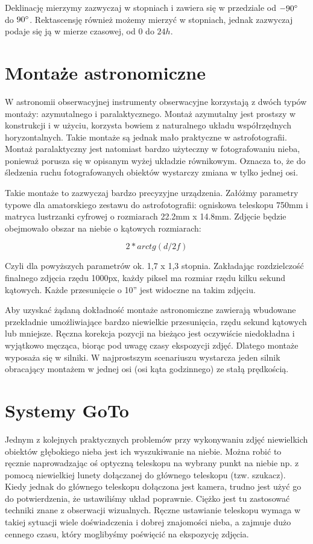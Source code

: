 Deklinację mierzymy zazwyczaj w stopniach i zawiera się w przedziale od
$-90\degree$ do $90\degree$. Rektascensję również możemy mierzyć w stopniach,
jednak zazwyczaj podaje się ją w mierze czasowej, od $0$ do $24h$.

\section{Montaże astronomiczne}

W astronomii obserwacyjnej instrumenty obserwacyjne korzystają z dwóch typów
montaży: azymutalnego i paralaktycznego. Montaż azymutalny jest prostszy
w konstrukcji i w użyciu, korzysta bowiem z naturalnego układu współrzędnych
horyzontalnych. Takie montaże są jednak mało praktyczne w astrofotografii.
Montaż paralaktyczny jest natomiast bardzo użyteczny w fotografowaniu nieba,
ponieważ porusza się w opisanym wyżej układzie równikowym. Oznacza to, że do
śledzenia ruchu fotografowanych obiektów wystarczy zmiana w tylko jednej osi. 

Takie montaże to zazwyczaj bardzo precyzyjne urządzenia. Załóżmy parametry
typowe dla amatorskiego zestawu do astrofotografii: ogniskowa teleskopu 750mm
i matryca lustrzanki cyfrowej o rozmiarach 22.2mm x 14.8mm. Zdjęcie będzie
obejmowało obszar na niebie o kątowych rozmiarach:

$$2*arc tg(d/2f)$$

Czyli dla powyższych parametrów ok. 1,7 x 1,3 stopnia. Zakładając rozdzielczość
finalnego zdjęcia rzędu 1000px, każdy piksel ma rozmiar rzędu kilku sekund
kątowych. Każde przesunięcie o 10'' jest widoczne na takim zdjęciu.

Aby uzyskać żądaną dokładność montaże astronomiczne zawierają wbudowane
przekładnie umożliwiające bardzo niewielkie przesunięcia, rzędu sekund
kątowych lub mniejsze. Ręczna korekcja pozycji na bieżąco jest oczywiście
niedokładna i wyjątkowo męcząca, biorąc pod uwagę czasy ekspozycji zdjęć.
Dlatego montaże wyposaża się w silniki. W najprostszym scenariuszu wystarcza
jeden silnik obracający montażem w jednej osi (osi kąta godzinnego) ze stałą
prędkością.

\section{Systemy GoTo}

Jednym z kolejnych praktycznych problemów przy wykonywaniu zdjęć niewielkich
obiektów głębokiego nieba jest ich wyszukiwanie na niebie. Można robić to
ręcznie naprowadzając oś optyczną teleskopu na wybrany punkt na niebie np.
z pomocą niewielkiej lunety dołączanej do głównego teleskopu (tzw. szukacz).
Kiedy jednak do głównego teleskopu dołączona jest kamera, trudno jest użyć go
do potwierdzenia, że ustawiliśmy układ poprawnie. Ciężko jest tu zastosować
techniki znane z obserwacji wizualnych. Ręczne ustawianie teleskopu wymaga
w takiej sytuacji wiele doświadczenia i dobrej znajomości nieba, a zajmuje
dużo cennego czasu, który moglibyśmy poświęcić na ekspozycję zdjęcia.

